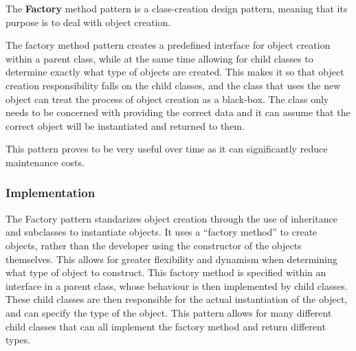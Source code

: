 \begin{summary}
    The {\bf Factory} method pattern is a class-creation design pattern,
    meaning that its purpose is to deal with object creation.

    The factory method pattern creates a predefined interface for object
    creation within a parent class, while at the same time allowing for
    child classes to determine exactly what type of objects are created. This
    makes it so that object creation responsibility falls on the child classes,
    and the class that uses the new object can treat the process of object
    creation as a black-box. The class only needs to be concerned with
    providing the correct data and it can assume that the correct object will
    be instantiated and returned to them.

    This pattern proves to be very useful over time as it can significantly
    reduce maintenance costs.
\end{summary}

\subsubsection{Implementation}
The Factory pattern standarizes object creation through the use of inheritance
and subclasses to instantiate objects. It uses a ``factory method'' to create
objects, rather than the developer using the constructor of the objects
themselves. This allows for greater flexibility and dynamism when determining
what type of object to construct. This factory method is specified within an
interface in a parent class, whose behaviour is then implemented by child
classes. These child classes are then responsible for the actual instantiation
of the object, and can specify the type of the object. This pattern allows for
many different child classes that can all implement the factory method and
return different types.

